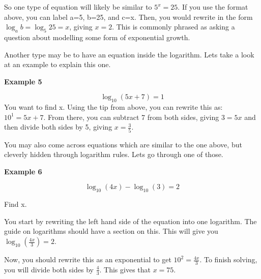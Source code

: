\documentclass[
  12pt,
  a4paper, oneside]{starmastarticle}
\begin{document}
So one type of equation will likely be similar to \(5^x=25\). If you use
the format above, you can label a=5, b=25, and c=x. Then, you would
rewrite in the form \(\log_a{b}=\log_5{25}=x\), giving \(x=2\). This is
commonly phrased as asking a question about modelling some form of
exponential growth.

Another type may be to have an equation inside the logarithm. Lets take
a look at an example to explain this one.

\begin{tcolorbox}[enhanced jigsaw, leftrule=.75mm, rightrule=.15mm, breakable, left=2mm, colback=white, bottomrule=.15mm, arc=.35mm, toprule=.15mm, opacityback=0, colframe=quarto-callout-note-color-frame]
\begin{minipage}[t]{5.5mm}
\textcolor{quarto-callout-note-color}{\faInfo}
\end{minipage}%
\begin{minipage}[t]{\textwidth - 5.5mm}

\textbf{Example 5}\vspace{2mm}

\[\log_{10}(5x+7)=1\] You want to find x. Using the tip from above, you
can rewrite this as: \(10^1=5x+7\). From there, you can subtract 7 from
both sides, giving \(3=5x\) and then divide both sides by 5, giving
\(x=\frac{3}{5}\).

\end{minipage}%
\end{tcolorbox}

You may also come across equations which are similar to the one above,
but cleverly hidden through logarithm rules. Lets go through one of
those.

\begin{tcolorbox}[enhanced jigsaw, leftrule=.75mm, rightrule=.15mm, breakable, left=2mm, colback=white, bottomrule=.15mm, arc=.35mm, toprule=.15mm, opacityback=0, colframe=quarto-callout-note-color-frame]
\begin{minipage}[t]{5.5mm}
\textcolor{quarto-callout-note-color}{\faInfo}
\end{minipage}%
\begin{minipage}[t]{\textwidth - 5.5mm}

\textbf{Example 6}\vspace{2mm}

\[\log_{10}(4x)-\log_{10}(3)=2\]

Find x.

You start by rewriting the left hand side of the equation into one
logarithm. The guide on logarithms should have a section on this. This
will give you \(\log_{10}(\frac{4x}{3})=2\).

Now, you should rewrite this as an exponential to get
\(10^2= \frac{4x}{3}\). To finish solving, you will divide both sides by
\(\frac{4}{3}\). This gives that \(x=75\).

\end{minipage}%
\end{tcolorbox}
\end{document}
